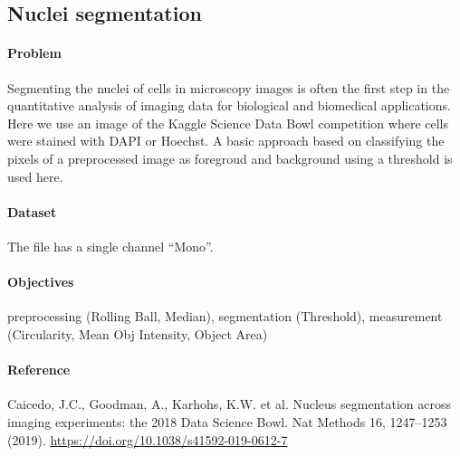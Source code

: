 \subsection{Nuclei segmentation} \label{sec:nuclei-segmentation}

\paragraph{Problem} Segmenting the nuclei of cells in microscopy images is often the first step in the quantitative analysis of imaging data for biological and biomedical applications. Here we use an image of the Kaggle Science Data Bowl competition where cells were stained with DAPI or Hoechst. A basic approach based on classifying the pixels of a preprocessed image as foregroud and background using a threshold is used here.

\paragraph{Dataset} The file  has a single channel ``Mono''.

\paragraph{Objectives} preprocessing (Rolling Ball, Median), segmentation (Threshold), measurement (Circularity, Mean Obj Intensity, Object Area)


\paragraph{Reference} Caicedo, J.C., Goodman, A., Karhohs, K.W. et al. Nucleus segmentation across imaging experiments: the 2018 Data Science Bowl. Nat Methods 16, 1247–1253 (2019). \url{https://doi.org/10.1038/s41592-019-0612-7}


